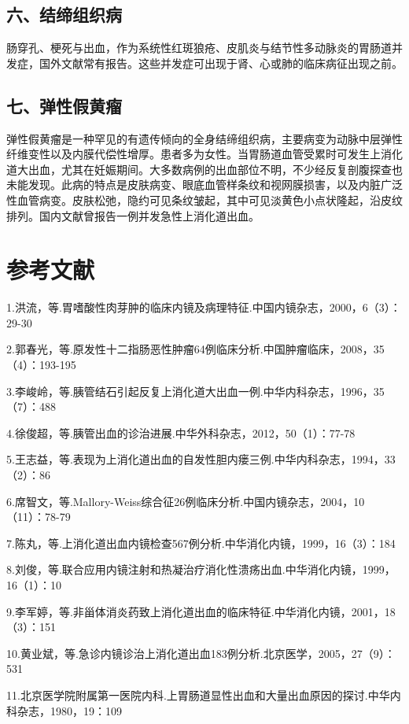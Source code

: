 \subsection{六、结缔组织病}

肠穿孔、梗死与出血，作为系统性红斑狼疮、皮肌炎与结节性多动脉炎的胃肠道并发症，国外文献常有报告。这些并发症可出现于肾、心或肺的临床病征出现之前。

\subsection{七、弹性假黄瘤}

弹性假黄瘤是一种罕见的有遗传倾向的全身结缔组织病，主要病变为动脉中层弹性纤维变性以及内膜代偿性增厚。患者多为女性。当胃肠道血管受累时可发生上消化道大出血，尤其在妊娠期间。大多数病例的出血部位不明，不少经反复剖腹探查也未能发现。此病的特点是皮肤病变、眼底血管样条纹和视网膜损害，以及内脏广泛性血管病变。皮肤松弛，隐约可见条纹皱起，其中可见淡黄色小点状隆起，沿皮纹排列。国内文献曾报告一例并发急性上消化道出血。

\protect\hypertarget{text00172.html}{}{}

\section{参考文献}

1.洪流，等.胃嗜酸性肉芽肿的临床内镜及病理特征.中国内镜杂志，2000，6（3）：29-30

2.郭春光，等.原发性十二指肠恶性肿瘤64例临床分析.中国肿瘤临床，2008，35（4）：193-195

3.李峻岭，等.胰管结石引起反复上消化道大出血一例.中华内科杂志，1996，35（7）：488

4.徐俊超，等.胰管出血的诊治进展.中华外科杂志，2012，50（1）：77-78

5.王志益，等.表现为上消化道出血的自发性胆内瘘三例.中华内科杂志，1994，33（2）：86

6.席智文，等.Mallory-Weiss综合征26例临床分析.中国内镜杂志，2004，10（11）：78-79

7.陈丸，等.上消化道出血内镜检查567例分析.中华消化内镜，1999，16（3）：184

8.刘俊，等.联合应用内镜注射和热凝治疗消化性溃疡出血.中华消化内镜，1999，16（1）：10

9.李军婷，等.非甾体消炎药致上消化道出血的临床特征.中华消化内镜，2001，18（3）：151

10.黄业斌，等.急诊内镜诊治上消化道出血183例分析.北京医学，2005，27（9）：531

11.北京医学院附属第一医院内科.上胃肠道显性出血和大量出血原因的探讨.中华内科杂志，1980，19：109

